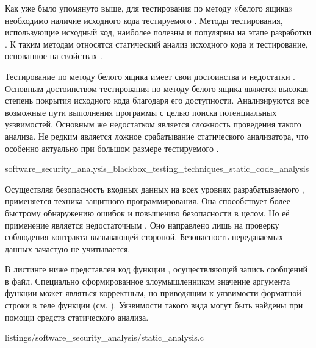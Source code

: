 %
Как уже было упомянуто выше, для тестирования  по методу «белого ящика» необходимо наличие исходного кода тестируемого . 
%
Методы тестирования, использующие исходный код, наиболее полезны и популярны на этапе разработки . 
%
К таким методам относятся статический анализ исходного кода и тестирование, основанное на свойствах .

%
Тестирование по методу белого ящика имеет свои достоинства и недостатки . 
%
Основным достоинством тестирования по методу белого ящика является высокая степень покрытия исходного кода благодаря его доступности. 
%
Анализируются все возможные пути выполнения программы с целью поиска потенциальных уязвимостей. 
%
Основным же недостатком является сложность проведения такого анализа. 
%
Не редким является ложное срабатывание статического анализатора, что особенно актуально при большом размере тестируемого .


	{software_security_analysis_blackbox_testing_techniques_static_code_analysis}

%
Осуществляя безопасность входных данных на всех уровнях разрабатываемого , применяется техника защитного программирования. 
%
Она способствует более быстрому обнаружению ошибок и повышению безопасности  в целом. 
%
Но её применение является недостаточным . 
%
Оно направлено лишь на проверку соблюдения контракта вызывающей стороной. 
%
Безопасность передаваемых данных зачастую не учитывается. 

%
В листинге ниже представлен код функции , осуществляющей запись сообщений в файл. 
%
Специально сформированное злоумышленником значение аргумента функции  может являться корректным, но приводящим к уязвимости форматной строки  в теле функции (см. ). 
%
Уязвимости такого вида могут быть найдены при помощи средств статического анализа.

	{listings/software_security_analysis/static_analysis.c}

